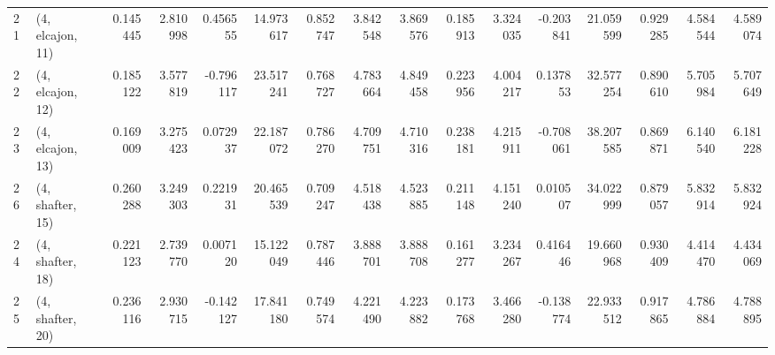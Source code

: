 \begin{tabular}{llrrrrrrrrrrrrrr}
21 &  (4, elcajon, 11) &   0.145445 &  2.810998 &  0.456555 &  14.973617 &  0.852747 &   3.842548 &  3.869576 &  0.185913 &  3.324035 & -0.203841 &   21.059599 &  0.929285 &   4.584544 &   4.589074 \\
22 &  (4, elcajon, 12) &   0.185122 &  3.577819 & -0.796117 &  23.517241 &  0.768727 &   4.783664 &  4.849458 &  0.223956 &  4.004217 &  0.137853 &   32.577254 &  0.890610 &   5.705984 &   5.707649 \\
23 &  (4, elcajon, 13) &   0.169009 &  3.275423 &  0.072937 &  22.187072 &  0.786270 &   4.709751 &  4.710316 &  0.238181 &  4.215911 & -0.708061 &   38.207585 &  0.869871 &   6.140540 &   6.181228 \\
26 &  (4, shafter, 15) &   0.260288 &  3.249303 &  0.221931 &  20.465539 &  0.709247 &   4.518438 &  4.523885 &  0.211148 &  4.151240 &  0.010507 &   34.022999 &  0.879057 &   5.832914 &   5.832924 \\
24 &  (4, shafter, 18) &   0.221123 &  2.739770 &  0.007120 &  15.122049 &  0.787446 &   3.888701 &  3.888708 &  0.161277 &  3.234267 &  0.416446 &   19.660968 &  0.930409 &   4.414470 &   4.434069 \\
25 &  (4, shafter, 20) &   0.236116 &  2.930715 & -0.142127 &  17.841180 &  0.749574 &   4.221490 &  4.223882 &  0.173768 &  3.466280 & -0.138774 &   22.933512 &  0.917865 &   4.786884 &   4.788895 \\
\bottomrule
\end{tabular}
